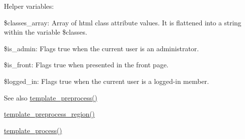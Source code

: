 Helper variables:
\begin{DoxyItemize}
\item \$classes\_\-array: Array of html class attribute values. It is flattened into a string within the variable \$classes.
\item \$is\_\-admin: Flags true when the current user is an administrator.
\item \$is\_\-front: Flags true when presented in the front page.
\item \$logged\_\-in: Flags true when the current user is a logged-\/in member.
\end{DoxyItemize}

\begin{DoxySeeAlso}{See also}
\hyperlink{includes_2theme_8inc_a3eeb7bcdba7ef4859f99586da264d347}{template\_\-preprocess()} 

\hyperlink{includes_2theme_8inc_a587933392ed2e45a220b08c5708ecaab}{template\_\-preprocess\_\-region()} 

\hyperlink{includes_2theme_8inc_a9b4d56c55dab2c59b7af6f71d6b1a940}{template\_\-process()} 
\end{DoxySeeAlso}
